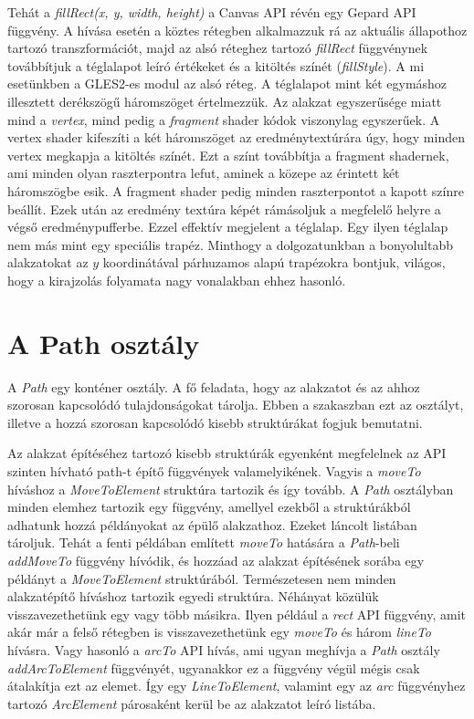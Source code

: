 \documentclass[12pt]{report}
\theoremstyle{definition}
\newcommand{\func}[1]{{\textsl{#1}}}
\begin{document}
Tehát a \func{fillRect(x, y, width, height)} a Canvas API révén egy Gepard API
függvény. A hívása esetén a köztes rétegben alkalmazzuk rá az aktuális
állapothoz tartozó transzformációt, majd az alsó réteghez tartozó
\func{fillRect} függvénynek továbbítjuk a téglalapot leíró értékeket és a
kitöltés színét (\func{fillStyle}). A mi esetünkben a GLES2-es modul az alsó
réteg. A téglalapot mint két egymáshoz illesztett derékszögű háromszöget
értelmezzük. Az alakzat egyszerűsége miatt mind a \emph{vertex}, mind pedig a
\emph{fragment} shader kódok viszonylag egyszerűek. A vertex shader kifeszíti a
két háromszöget az eredménytextúrára úgy, hogy minden vertex megkapja a
kitöltés színét. Ezt a színt továbbítja a fragment shadernek, ami minden olyan
raszterpontra lefut, aminek a közepe az érintett két háromszögbe esik. A
fragment shader pedig minden raszterpontot a kapott színre beállít. Ezek után
az eredmény textúra képét rámásoljuk a megfelelő helyre a végső
eredménypufferbe. Ezzel effektív megjelent a téglalap. Egy ilyen téglalap nem
más mint egy speciális trapéz. Minthogy a dolgozatunkban a bonyolultabb
alakzatokat az $y$ koordinátával párhuzamos alapú trapézokra bontjuk, világos,
hogy a kirajzolás folyamata nagy vonalakban ehhez hasonló.

    \section[A Path osztály]{A Path osztály}
    \label{sec:A_Path_osztály}

A \func{Path} egy konténer osztály. A fő feladata, hogy az alakzatot és az
ahhoz szorosan kapcsolódó tulajdonságokat tárolja. Ebben a szakaszban ezt az
osztályt, illetve a hozzá szorosan kapcsolódó kisebb struktúrákat fogjuk
bemutatni.

Az alakzat építéséhez tartozó kisebb struktúrák egyenként megfelelnek az API
szinten hívható path-t építő függvények valamelyikének. Vagyis a \func{moveTo}
híváshoz a \func{MoveToElement} struktúra tartozik és így tovább. A \func{Path}
osztályban minden elemhez tartozik egy függvény, amellyel ezekből a
struktúrákból adhatunk hozzá példányokat az épülő alakzathoz. Ezeket láncolt
listában tároljuk. Tehát a fenti példában említett \func{moveTo} hatására a
\func{Path}-beli \func{addMoveTo} függvény hívódik, és hozzáad az alakzat
építésének sorába egy példányt a \func{MoveToElement} struktúrából.
Természetesen nem minden alakzatépítő híváshoz tartozik egyedi struktúra.
Néhányat közülük visszavezethetünk egy vagy több másikra. Ilyen például a
\func{rect} API függvény, amit akár már a felső rétegben is visszavezethetünk
egy \func{moveTo} és három \func{lineTo} hívásra. Vagy hasonló a \func{arcTo}
API hívás, ami ugyan meghívja a \func{Path} osztály \func{addArcToElement}
függvényét, ugyanakkor ez a függvény végül mégis csak átalakítja ezt az elemet.
Így egy \func{LineToElement}, valamint egy az \func{arc} függvényhez tartozó
\func{ArcElement} párosaként kerül be az alakzatot leíró listába.
\end{document}
